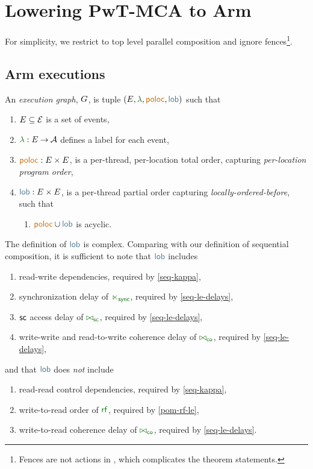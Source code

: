\section{Lowering PwT-MCA to Arm}
\label{sec:arm}
For simplicity, we restrict to top level parallel composition and ignore
fences\footnote{Fences are not actions in \armeight{}, which complicates the
  theorem statements.}.

\subsection{Arm executions}
\begin{definition}
  An \emph{\armeight{} execution graph}, $G$, is tuple
  $(\aEvs, \labeling, {\rpoloc}, {\rlob})$ such that
  \begin{enumerate}[,label=(\textsc{a}\arabic*),ref=\textsc{a}\arabic*]
  \item $E\subseteq\mathcal{E}$ is a set of {events},
  \item $\labeling: \aEvs \fun \Act$ defines a {label} for each event,
  \item ${\rpoloc} : \aEvs\times\aEvs$, is a per-thread, per-location total
    order, capturing \emph{per-location program order},
  \item ${\rlob} : \aEvs\times\aEvs$, is a per-thread partial order capturing
    \emph{locally-ordered-before}, such that
    \begin{enumerate}
    \item \label{arm-lob-poloc}
      ${\rpoloc} \cup {\rlob}$ is acyclic.
    \end{enumerate}
  \end{enumerate}
\end{definition}

The definition of $\rlob$ is complex.  Comparing with our definition of
sequential composition, it is sufficient to note that $\rlob$ includes
\begin{enumerate}[label=(\textsc{l}\arabic*),ref=\textsc{l}\arabic*]
\item read-write dependencies, required by \ref{seq-kappa},
\item synchronization delay of ${\reorderra}$, required by \ref{seq-le-delays},
\item ${\mathsf{sc}}$ access delay of ${\eqreordersc}$, required by \ref{seq-le-delays},
\item write-write and read-to-write coherence delay of ${\eqreorderco}$, required by \ref{seq-le-delays},
\end{enumerate}
and that $\rlob$ does \emph{not} include
\begin{enumerate}[resume,label=(\textsc{l}\arabic*),ref=\textsc{l}\arabic*]
\item \label{lob-rr} 
  read-read control dependencies, required by \ref{seq-kappa},
\item \label{lob-rf}
  write-to-read order of $\rrfx$, required by \ref{pom-rf-le},
\item \label{lob-wr}
  write-to-read coherence delay of ${\eqreorderco}$, required by \ref{seq-le-delays}.
\end{enumerate}

